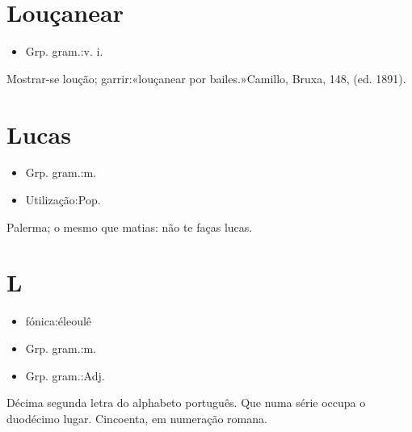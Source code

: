 \section{Louçanear}
\begin{itemize}
\item {Grp. gram.:v. i.}
\end{itemize}
Mostrar-se loução; garrir:«\textunderscore louçanear por bailes.\textunderscore »Camillo, \textunderscore Bruxa\textunderscore , 148, (ed. 1891).
\section{Lucas}
\begin{itemize}
\item {Grp. gram.:m.}
\end{itemize}
\begin{itemize}
\item {Utilização:Pop.}
\end{itemize}
Palerma; o mesmo que \textunderscore matias\textunderscore : \textunderscore não te faças lucas\textunderscore .
\section{L}
\begin{itemize}
\item {fónica:éleoulê}
\end{itemize}
\begin{itemize}
\item {Grp. gram.:m.}
\end{itemize}
\begin{itemize}
\item {Grp. gram.:Adj.}
\end{itemize}
Décima segunda letra do alphabeto português.
Que numa série occupa o duodécimo lugar.
Cincoenta, em numeração romana.
